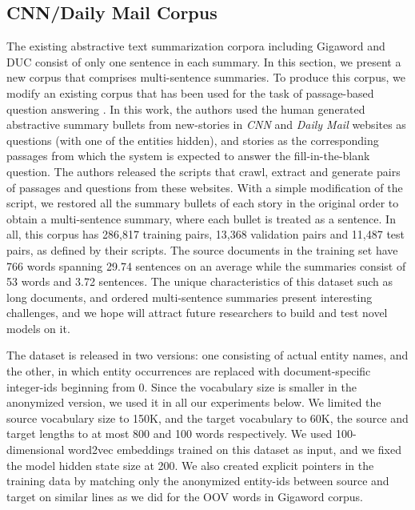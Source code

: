 \subsection{CNN/Daily Mail Corpus}
The existing abstractive text summarization corpora including Gigaword and DUC consist of only one sentence in each summary. In this section, we present a new corpus that comprises multi-sentence summaries. To produce this corpus, we modify an existing corpus that has been used for the task of passage-based question answering \cite{reading_comprehension}. In this work, the authors used the human generated abstractive summary bullets from new-stories in {\it CNN} and {\it Daily Mail} websites as questions (with one of the entities hidden), and stories as the corresponding passages from which the system is expected to answer the fill-in-the-blank question. The authors released the scripts that crawl,  extract and generate pairs of passages and questions from these websites. With a simple modification of the script, we restored all the summary bullets of each story in the original order to obtain a multi-sentence summary, where each bullet is treated as a sentence. In all, this corpus has 286,817 training pairs, 13,368 validation pairs and 11,487 test pairs, as defined by their scripts. The source documents in the training set have 766 words spanning 29.74 sentences on an average while the summaries consist of 53 words and 3.72 sentences. The unique characteristics of this dataset such as long documents, and ordered multi-sentence summaries present interesting challenges, and we hope will attract future researchers to build and test novel models on it.

The dataset is released in two versions: one consisting of actual entity names, and the other, in which entity occurrences are replaced with document-specific integer-ids beginning from 0. Since the vocabulary size is smaller in the anonymized version, we used it in all our experiments below. We limited the source vocabulary size to 150K, and the target vocabulary to 60K, the source and target lengths to at most 800 and 100 words respectively. We used 100-dimensional word2vec embeddings trained on this dataset as input, and we fixed the model hidden state size at 200. We also created explicit pointers in the training data by matching only the anonymized entity-ids between source and target on similar lines as we did for the OOV words in Gigaword corpus. 

